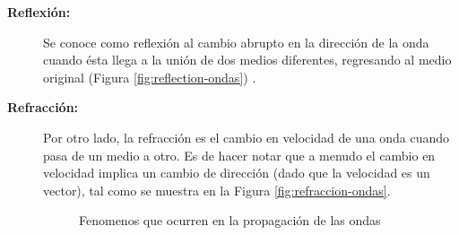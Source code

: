 \begin{description}
\item[\bf Reflexi\'on:] Se conoce como  reflexi\'on al cambio abrupto en la direcci\'on de la onda cuando \'esta llega a la uni\'on de dos medios diferentes, regresando al medio original (Figura \ref{fig:reflection-ondas}) . 

\item[\bf Refracci\'on:] Por otro lado, la refracci\'on es el cambio en velocidad de una onda
cuando pasa de un medio a otro. Es de hacer notar que a menudo el
cambio en velocidad implica un cambio de direcci\'on (dado que la
velocidad es un vector), tal como se muestra en la Figura
\ref{fig:refraccion-ondas}.

\begin{figure}[!h]
  \centering {}
  \caption{Fenomenos que ocurren en la propagaci\'on de las ondas}
\end{figure}


\end{description}
